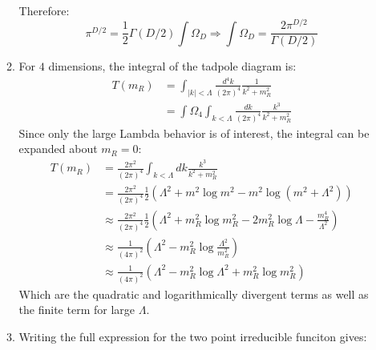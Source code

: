 \documentclass[12pt,a4]{article}
\begin{document}
\begin{enumerate}
\begin{enumerate}
\begin{align*}
        \end{align*}
        Therefore:
        \begin{equation*}
          \pi^{D/ 2} = \frac{1}{2} \Gamma(D / 2)\int \Omega_D  \Rightarrow \int \Omega_D = \frac{2\pi^{D/ 2}}{ \Gamma(D / 2)}
        \end{equation*}
      \item
        For $4$ dimensions, the integral of the tadpole diagram is:
        \begin{align*}
          T(m_R)  & = \int_{|k| < \Lambda} \frac{d^4 k}{(2 \pi)^4} \frac{1}{k^2 + m_R^2} \\
                  & = \int \Omega_4 \int_{k < \Lambda}  \frac{d k}{(2 \pi)^4} \frac{k^3 }{k^2 + m_R^2}
        \end{align*}
        Since only the large Lambda behavior is of interest, the integral can be expanded about $m_R = 0$:
        \begin{align*}
          T(m_R)  & = \frac{2 \pi^{2}}{(2 \pi)^4}\int_{k < \Lambda}  d k \frac{k^3 }{k^2 + m_R^2}\\
                  & = \frac{2 \pi^{2}}{(2 \pi)^4}\frac{1}{2} (\Lambda^2 + m^2 \log m^2 - m^2 \log (m^2 + \Lambda^2))\\
                  & \approx \frac{2 \pi^{2}}{(2 \pi)^4}\frac{1}{2} \left(\Lambda^2 + m_R^2 \log m_R^2 - 2m_R^2 \log \Lambda  - \frac{m_R^4}{\Lambda^2}\right)\\
                  & \approx \frac{1}{(4 \pi)^2} \left(\Lambda^2 - m_R^2 \log \frac{\Lambda^2}{m_R^2} \right)\\
                  & \approx \frac{1}{(4 \pi)^2} \left(\Lambda^2 - m_R^2 \log \Lambda^2 + m_R^2\log m_R^2 \right)
        \end{align*}
        Which are the quadratic and logarithmically divergent terms as well as the finite term for large $\Lambda$.
      \item
        Writing the full expression for the two point irreducible funciton gives:
        \begin{equation*}

\end{equation*}
\end{enumerate}
\end{enumerate}
\end{document}
